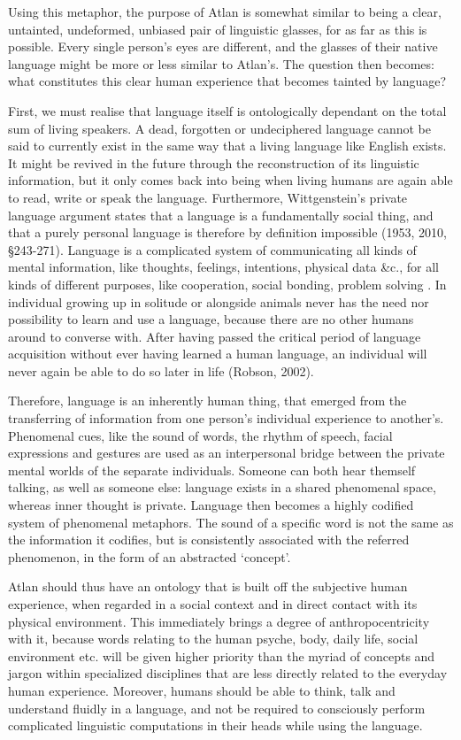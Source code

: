 Using this metaphor, the purpose of Atlan is somewhat similar to being a clear, untainted, undeformed, unbiased pair of linguistic glasses, for as far as this is possible. Every single person’s eyes are different, and the glasses of their native language might be more or less similar to Atlan’s. The question then becomes: what constitutes this clear human experience that becomes tainted by language?  

First, we must realise that language itself is ontologically dependant on the total sum of living speakers. A dead, forgotten or undeciphered language cannot be said to currently exist in the same way that a living language like English exists. It might be revived in the future through the reconstruction of its linguistic information, but it only comes back into being when living humans are again able to read, write or speak the language. Furthermore, Wittgenstein’s private language argument states that a language is a fundamentally social thing, and that a purely personal language is therefore by definition impossible (1953, 2010, \S 243-271). Language is a complicated system of communicating all kinds of mental information, like thoughts, feelings, intentions, physical data \&c., for all kinds of different purposes, like cooperation, social bonding, problem solving . In individual growing up in solitude or alongside animals never has the need nor possibility to learn and use a language, because there are no other humans around to converse with. After having passed the critical period of language acquisition without ever having learned a human language, an individual will never again be able to do so later in life (Robson, 2002).  

Therefore, language is an inherently human thing, that emerged from the transferring of information from one person’s individual experience to another’s. Phenomenal cues, like the sound of words, the rhythm of speech, facial expressions and gestures are used as an interpersonal bridge between the private mental worlds of the separate individuals. Someone can both hear themself talking, as well as someone else: language exists in a shared phenomenal space, whereas inner thought is private. Language then becomes a highly codified system of phenomenal metaphors. The sound of a specific word is not the same as the information it codifies, but is consistently associated with the referred phenomenon, in the form of an abstracted ‘concept’. 

Atlan should thus have an ontology that is built off the subjective human experience, when regarded in a social context and in direct contact with its physical environment. This immediately brings a degree of anthropocentricity with it, because words relating to the human psyche, body, daily life, social environment etc. will be given higher priority than the myriad of concepts and jargon within specialized disciplines that are less directly related to the everyday human experience. Moreover, humans should be able to think, talk and understand fluidly in a language, and not be required to consciously perform complicated linguistic computations in their heads while using the language. 

